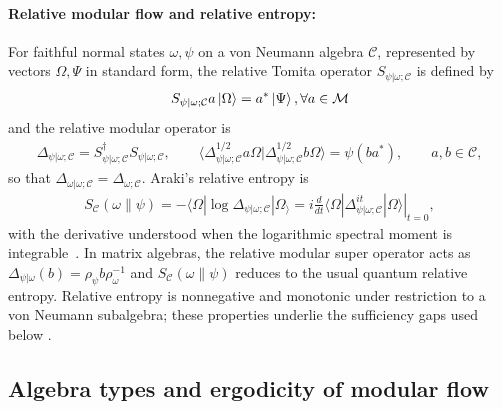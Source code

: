 \documentclass[a4paper,11pt]{article}
\theoremstyle{definition}
\newcommand{\mM}{\mathcal{M}}
\begin{document}
\paragraph{Relative modular flow and relative entropy:}
For faithful normal states $\omega,\psi$ on a von Neumann algebra $\mathcal C$, represented by vectors $\Omega,\Psi$ in standard form, the relative Tomita operator $S_{\psi|\omega;\mathcal C}$ is defined by
\begin{align}
 S_{\psi|\omega;\mathcal C} a\ket{\Omega}=a^*\ket{\Psi},  \forall a\in\mM
\end{align}
and the relative modular operator is
\begin{align}
 \Delta_{\psi|\omega;\mathcal C}=S_{\psi|\omega;\mathcal C}^\dagger S_{\psi|\omega;\mathcal C},
 \qquad
 \langle\Delta_{\psi|\omega;\mathcal C}^{1/2}a\Omega|\Delta_{\psi|\omega;\mathcal C}^{1/2}b\Omega\rangle=\psi(ba^*),\qquad a,b\in\mathcal C,
 \label{eq:relative-modular}
\end{align}
so that $\Delta_{\omega|\omega;\mathcal C}=\Delta_{\omega;\mathcal C}$. Araki's relative entropy is
\begin{align}
 S_{\mathcal C}(\omega\|\psi)
 =-\langle\Omega|\log\Delta_{\psi|\omega;\mathcal C}|\Omega_\rangle
 =i\left.\frac{d}{dt}\langle\Omega|\Delta_{\psi|\omega;\mathcal C}^{it}|\Omega\rangle\right|_{t=0},
 \label{eq:relative-entropy}
\end{align}
with the derivative understood when the logarithmic spectral moment is integrable~\cite{Araki1976,Araki1977}. In matrix algebras, the relative modular super operator acts as  $\Delta_{\psi|\omega}(b)=\rho_\psi b \rho_\omega^{-1}$ and $S_{\mathcal C}(\omega\|\psi)$ reduces to the usual quantum relative entropy. Relative entropy is nonnegative and monotonic under restriction to a von Neumann subalgebra; these properties underlie the sufficiency gaps used below \cite{Araki1976}.

\subsection{Algebra types and ergodicity of modular flow}\label{subsec:types-modular}

\end{document}
